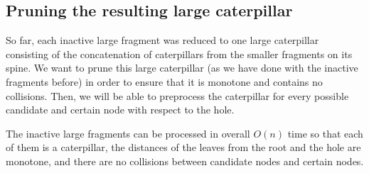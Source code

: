 \documentclass[a4paper,UKenglish]{lipics-v2016}
\theoremstyle{plain}
\begin{document}
\subsection{Pruning the resulting large caterpillar}\label{section:lemma3}
So far, each inactive large fragment was reduced to one large caterpillar consisting of the concatenation of caterpillars from the smaller fragments on its spine. We want
to prune this large caterpillar (as we have done with the inactive fragments before) in order to ensure
that it is monotone and contains no collisions.   Then, we will
be able to preprocess the caterpillar for every possible candidate and certain node with respect to the hole.

\begin{lemma}\label{lemma3}
	The inactive large fragments can be processed in overall $O(n)$ time so that each of them is a caterpillar, the distances of the leaves from the root and the hole are monotone, and there are no collisions between candidate nodes and certain nodes.
\end{lemma}
\end{document}
